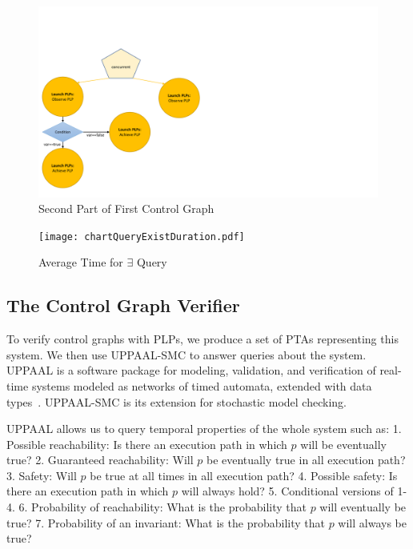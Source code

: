 \documentclass[letterpaper]{article}
\begin{document}

\begin{figure}[]
\centering
\includegraphics[scale=0.5]{controlTree2.pdf}
\vspace{-0.08in}
\caption{Second Part of First Control Graph}
\label{fig:controlTree2}
\end{figure}

\begin{figure}[h]
\centering
  \texttt{[image: chartQueryExistDuration.pdf]}
  \vspace{-0.18in} 
  \caption{Average Time for $\exists$ Query}
  \label{fig:time-exists} 
\end{figure} 


\subsection{The Control Graph Verifier}
To verify control graphs with PLPs, we produce a set of PTAs representing this system. We then use UPPAAL-SMC  to answer queries about the system. UPPAAL is a software package for modeling, validation, and verification of real-time systems modeled as networks of timed automata, extended with data types~\citep{BehrmannDLHPYH06}. UPPAAL-SMC is its extension for stochastic model checking.


UPPAAL allows us to query temporal properties of the whole system such as: 1. Possible reachability: Is there an execution path in which $p$ will be eventually true? 2. Guaranteed reachability: Will $p$ be eventually true in all execution path? 3. Safety: Will $p$ be true at all times in all execution path? 4. Possible safety: Is there an execution path in which $p$ will always hold? 5.  Conditional versions of 1-4. 
6. Probability of reachability: What is the probability that $p$ will eventually be true? 7. Probability of an invariant: What is the probability that $p$ will always be true?
\end{document}
